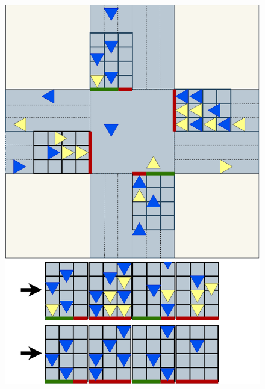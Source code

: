\documentclass[journal]{IEEEtran}
\begin{document}
\begin{figure}[htbp]
  \begin{center}  
    \includegraphics[width=0.8\linewidth,keepaspectratio]{img/model/partial_dtse.png}  
  \end{center}
\end{figure}
\end{document}
